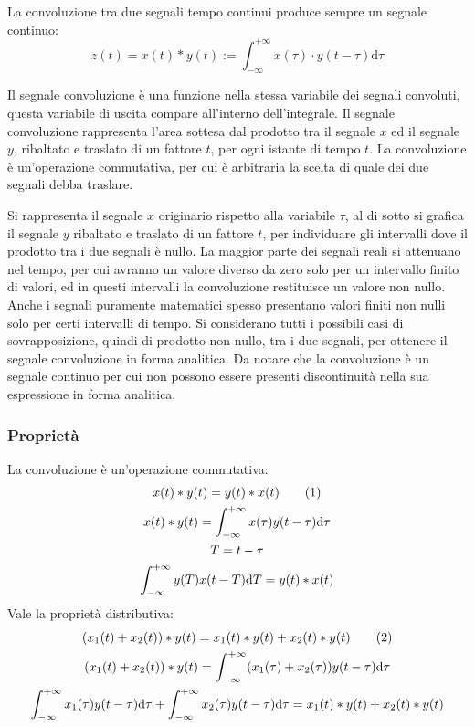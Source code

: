\documentclass{article}
\newcommand{\df}{\mathrm{d}}
\newcommand{\tageq}{\tag{\stepcounter{equation}\theequation}}
\numberwithin{equation}{subsection}
\begin{document}
La convoluzione tra due segnali tempo continui produce sempre un segnale continuo: 
\begin{equation}
    z(t)=x(t)*y(t):=\displaystyle\int_{-\infty}^{+\infty}x(\tau)\cdot y(t-\tau)\df\tau
\end{equation}

Il segnale convoluzione è una funzione nella stessa variabile dei segnali convoluti, questa variabile di uscita compare all'interno dell'integrale. Il segnale convoluzione 
rappresenta l'area sottesa dal prodotto tra il segnale $x$ ed il segnale $y$, ribaltato e traslato di un fattore $t$, per ogni istante di tempo $t$. La convoluzione 
è un'operazione commutativa, per cui è arbitraria la scelta di quale dei due segnali debba traslare. 

Si rappresenta il segnale $x$ originario rispetto alla variabile $\tau$, al di sotto si grafica il segnale $y$ ribaltato e traslato di un fattore $t$, per individuare gli 
intervalli dove il prodotto tra i due segnali è nullo. La maggior parte dei segnali reali si attenuano nel tempo, per cui avranno un valore diverso da zero solo per un 
intervallo finito di valori, ed in questi intervalli la convoluzione restituisce un valore non nullo. Anche i segnali puramente matematici spesso presentano valori finiti 
non nulli solo per certi intervalli di tempo. Si considerano tutti i possibili casi di sovrapposizione, quindi di prodotto non nullo, tra i due segnali, per ottenere 
il segnale convoluzione in forma analitica. Da notare che la convoluzione è un segnale continuo per cui non possono essere presenti discontinuità nella sua espressione 
in forma analitica. 

\subsubsection{Proprietà}

La convoluzione è un'operazione commutativa:
\begin{gather*}
    x(t)*y(t)=y(t)*x(t)\tageq\\
    x(t)*y(t)=\displaystyle\int_{-\infty}^{+\infty}x(\tau)y(t-\tau)\df\tau\\
    {T=t-\tau}\\
    \int_{-\infty}^{+\infty}y(T)x(t-T)\df T=y(t)*x(t)
\end{gather*}
Vale la proprietà distributiva:
\begin{gather*}
    (x_1(t)+x_2(t))*y(t)=x_1(t)*y(t)+x_2(t)*y(t)\tageq\\
    (x_1(t)+x_2(t))*y(t)=\displaystyle\int_{-\infty}^{+\infty}(x_1(\tau)+x_2(\tau))y(t-\tau)\df\tau\\
    \int_{-\infty}^{+\infty}x_1(\tau)y(t-\tau)\df\tau+\int_{-\infty}^{+\infty}x_2(\tau)y(t-\tau)\df\tau=x_1(t)*y(t)+x_2(t)*y(t)
\end{gather*}
\end{document}

